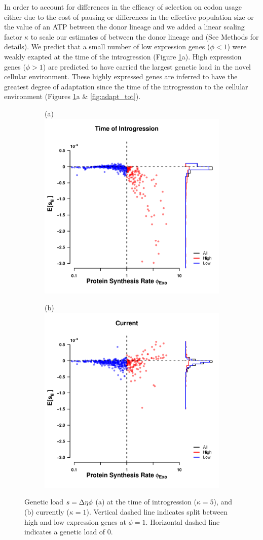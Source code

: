 \documentclass[fleqn,letterpaper]{article}
\begin{document}
In order to account for differences in the efficacy of selection on codon usage either due to the cost of pausing or differences in the effective population size or the value of an ATP between the donor lineage and \kluyveri we added a linear scaling factor $\kappa$ to scale our estimates of \DE between the donor lineage and \kluyveri  (See Methods for details).
We predict that a small number of low expression genes ($\phi < 1$) were weakly exapted at the time of the introgression (Figure \ref{fig:sne_fitness_burden}a).
High expression genes ($\phi > 1$) are predicted to have carried the largest genetic load in the novel cellular environment.
These highly expressed genes are inferred to have the greatest degree of adaptation since the time of the introgression to the \kluyveri cellular environment (Figures \ref{fig:sne_fitness_burden}a \& \ref{fig:adapt_tot}).

\begin{figure}
    \centering
    \begin{subfigure}
        \centering
        (a) \includegraphics[width=.45\textwidth]{img/fitness_difference_gos_kappa5.pdf}
    \end{subfigure}
    \begin{subfigure}
        \centering
        (b) \includegraphics[width=.45\textwidth]{img/fitness_difference_exo.pdf}
    \end{subfigure}
    \caption{Genetic load $s = {\Delta \eta} \phi$ (a) at the time of introgression ($\kappa = 5$), and (b) currently ($\kappa = 1$). 
        Vertical dashed line indicates split between high and low expression genes at $\phi = 1$.
    	Horizontal dashed line indicates a genetic load of 0.}
    \label{fig:sne_fitness_burden}
\end{figure}
\end{document}
